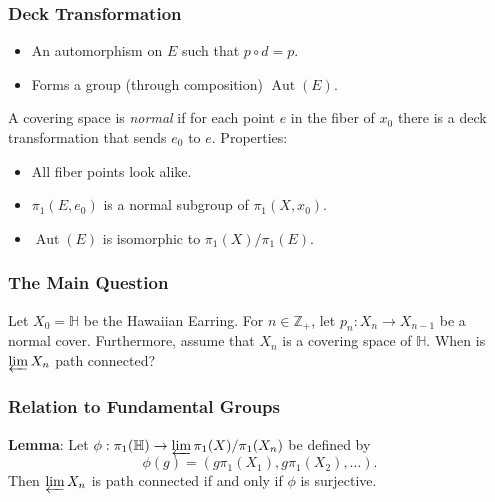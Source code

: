 \documentclass{beamer}
\newcommand{\HE}{\mathbb{H}}
\DeclareMathOperator{\Aut}{Aut}
\begin{document}
\begin{frame}[allowframebreaks]
\frametitle{Deck Transformation}
\begin{itemize}
\item  An automorphism on $E$ such that $p \circ d = p$.
\item  Forms a group (through composition) $\Aut(E)$.
\end{itemize}
\begin{figure}[h]
\centering{
\resizebox{!}{4cm}{\fontsize{40}{48}\selectfont {deck_transformation_commutative.pdf_tex}}
}
\end{figure}

\pagebreak

A covering space is \textit{normal} if for each point $e$ in the fiber of $x_0$ there is a deck transformation that sends $e_0$ to $e$.
Properties:
\begin{itemize}
\item  All fiber points look alike.
\item  $\pi_1(E, e_0)$ is a normal subgroup of $\pi_1(X, x_0)$.
\item  $\Aut(E)$ is isomorphic to $\pi_1(X) / \pi_1(E)$.
\end{itemize}

\pagebreak

\begin{figure}[h]
\centering{
\resizebox{!}{6cm}{\fontsize{40}{48}\selectfont {deck_transformation.pdf_tex}}
\resizebox{!}{6cm}{\fontsize{40}{48}\selectfont {not_normal_cover.pdf_tex}}
}
\end{figure}
\end{frame}


\begin{frame}
\frametitle{The Main Question}
Let $X_0 = \HE$ be the Hawaiian Earring.  For $n \in \mathbb{Z}_+$, let $p_n : X_n \to X_{n-1}$ be a normal cover.  Furthermore, assume that $X_n$ is a covering space of $\HE$.  When is $\varprojlim X_n$ path connected?
\end{frame}

\begin{frame}
\frametitle{Relation to Fundamental Groups}
\textbf{Lemma}:  Let $\phi : \pi_1(\HE) \to \varprojlim \pi_1(X) / \pi_1(X_n)$ be defined by
$$\phi(g) = (g\pi_1(X_1), g\pi_1(X_2), \dots).$$
Then $\varprojlim X_n$ is path connected if and only if $\phi$ is surjective.

\begin{figure}[h]
\centering{
\resizebox{!}{3cm}{\fontsize{40}{48}\selectfont {phi_lemma.pdf_tex}}
}
\end{figure}
\end{frame}
\end{document}
